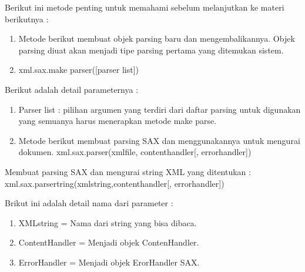 Berikut ini metode penting untuk memahami sebelum melanjutkan ke materi berikutnya : 
\begin{enumerate}
  \item Metode berikut membuat objek parsing baru dan mengembalikannya. Objek parsing diuat akan menjadi tipe parsing pertama yang ditemukan sistem.
  \item xml.sax.make parser([parser list])
\end{enumerate}

Berikut adalah detail parameternya : 
\begin{enumerate}
  \item Parser list : pilihan argumen yang terdiri dari daftar parsing untuk digunakan yang semuanya harus menerapkan metode {make    parse}.
  \item Metode berikut membuat parsing SAX dan menggunakannya untuk mengurai dokumen. xml.sax.parser(xmlfile, contenthandler[, errorhandler])
\end{enumerate}

Membuat parsing SAX dan mengurai string XML yang ditentukan : 
xml.sax.parsertring(xmlstring,contenthandler[, errorhandler])

Brikut ini adalah detail nama dari parameter : 
\begin{enumerate}
  \item  {XMLstring}  = Nama dari string yang bisa dibaca.
  \item  {ContentHandler} = Menjadi objek ContenHandler.
  \item  {ErrorHandler} = Menjadi objek ErorHandler SAX. 
\end{enumerate}

